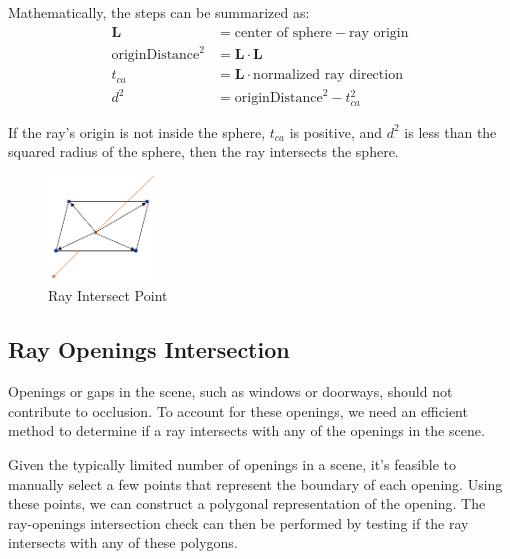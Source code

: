 \documentclass[11pt, a4paper,oneside,chapterprefix=false]{scrbook}
\begin{document}
\vspace{10pt}

Mathematically, the steps can be summarized as:
\begin{align*}
	\mathbf{L} &= \text{center of sphere} - \text{ray origin} \\
	\text{originDistance}^2 &= \mathbf{L} \cdot \mathbf{L} \\
	t_{ca} &= \mathbf{L} \cdot \text{normalized ray direction} \\
	d^2 &= \text{originDistance}^2 - t_{ca}^2
\end{align*}

If the ray's origin is not inside the sphere, \( t_{ca} \) is positive, and \( d^2 \) is less than the squared radius of the sphere, then the ray intersects the sphere.

\begin{minipage}{\textwidth}
	\begin{figure}[H]
		\centering
		\includegraphics*[width=0.25\textwidth]{figures/intersect polygon.png}
		\caption{Ray Intersect Point}
		\label{fig:ray intersect point}
	\end{figure}
\end{minipage}

\subsection{Ray Openings Intersection}

Openings or gaps in the scene, such as windows or doorways, should not contribute to occlusion. To account for these openings, we need an efficient method to determine if a ray intersects with any of the openings in the scene.

\vspace{10pt}

Given the typically limited number of openings in a scene, it's feasible to manually select a few points that represent the boundary of each opening. Using these points, we can construct a polygonal representation of the opening. The ray-openings intersection check can then be performed by testing if the ray intersects with any of these polygons.
\end{document}
